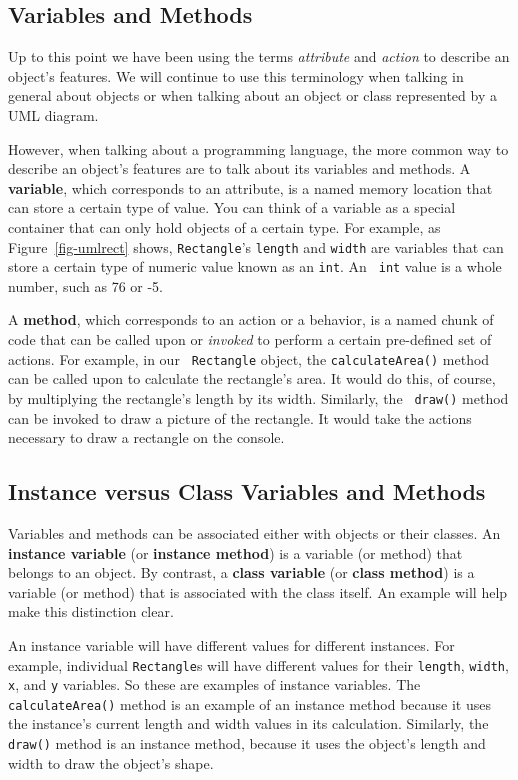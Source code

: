 \subsection{Variables and Methods}

Up to this point we have been using the terms {\em attribute} and {\em
action} to describe an object's features. We will continue to use this
terminology when talking in general about objects or when talking
about an object or class represented by a UML diagram.

However, when talking about a programming language, the more common
way to describe an object's features are to talk about its variables
and methods. A {\bf variable}, which corresponds to an attribute, is a
named memory location that can store a certain type of value.  You can
think of a variable as a special container that can only hold objects
of a certain type.  For example, as Figure~\ref{fig-umlrect} shows,
{\tt Rectangle}'s {\tt length} and {\tt width} are variables that can
store a certain type of numeric value known as an {\tt int}. An {\tt
int} value is a whole number, such as 76 or -5.

A {\bf method}, which corresponds to an action or a behavior, is a
named chunk of code that can be called upon or {\em invoked} to
perform a certain pre-defined set of actions. For example, in our {\tt
Rectangle} object, the {\tt calculateArea()} method can be called upon
to calculate the rectangle's area.  It would do this, of course, by
multiplying the rectangle's length by its width. Similarly, the {\tt
draw()} method can be invoked to draw a picture of the rectangle. It
would take the actions necessary to draw a rectangle on the console.

\subsection{Instance versus Class Variables and Methods}

Variables and methods can be associated either with objects or their
classes. An {\bf instance variable} (or {\bf instance method}) is a
variable (or method) that belongs to an object. By contrast, a {\bf
class variable} (or {\bf class method}) is a variable (or method) that
is associated with the class itself.  An example will help make this
distinction clear.

An instance variable will have different values for different
instances.  For example, individual {\tt Rectangle}s will have
different values for their {\tt length}, {\tt width}, {\tt x}, and
{\tt y} variables.  So these are examples of instance variables.  The
{\tt calculateArea()} method is an example of an instance method
because it uses the instance's current length and width values in its
calculation. Similarly, the {\tt draw()} method is an instance method,
because it uses the object's length and width to draw the object's
shape.

